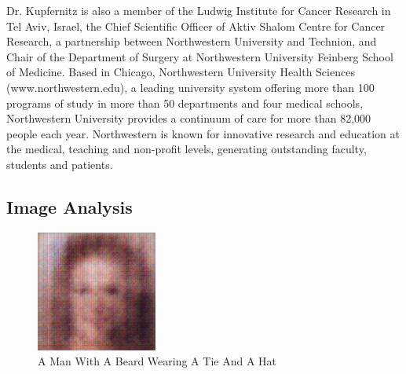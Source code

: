 \documentclass{article}%
\begin{document}
Dr. Kupfernitz is also a member of the Ludwig Institute for Cancer Research in Tel Aviv, Israel, the Chief Scientific Officer of Aktiv Shalom Centre for Cancer Research, a partnership between Northwestern University and Technion, and Chair of the Department of Surgery at Northwestern University Feinberg School of Medicine.\newline%
Based in Chicago, Northwestern University Health Sciences (www.northwestern.edu), a leading university system offering more than 100 programs of study in more than 50 departments and four medical schools, Northwestern University provides a continuum of care for more than 82,000 people each year. Northwestern is known for innovative research and education at the medical, teaching and non{-}profit levels, generating outstanding faculty, students and patients.

%
\subsection{Image Analysis}%
\label{subsec:ImageAnalysis}%


\begin{figure}[h!]%
\centering%
\includegraphics[width=150px]{500_fake_images/samples_5_157.png}%
\caption{A Man With A Beard Wearing A Tie And A Hat}%
\end{figure}

%
\end{document}
